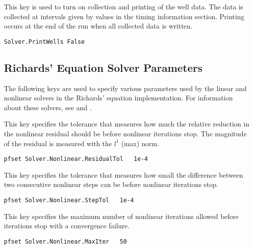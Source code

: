 {
This key is used to turn on collection and printing of the
well data.  The data is collected at intervals given by values
in the timing information section.  Printing occurs at the
end of the run when all collected data is written. 
}
\begin{display}\begin{verbatim}
Solver.PrintWells False
\end{verbatim}\end{display}


\subsection{Richards' Equation Solver Parameters}
\label{RE Solver Parameters}

The following keys are used to specify various parameters used by the linear
and nonlinear solvers in the Richards' equation implementation.
For information about these solvers, see 
\cite{Woodward98} and \cite{Ashby-Falgout90}.

{This key specifies the tolerance that measures how much the relative 
reduction in the nonlinear residual should be before nonlinear 
iterations stop.  The magnitude of the residual is measured with 
the $l^1$ (max) norm.
}
\begin{display}\begin{verbatim}
pfset Solver.Nonlinear.ResidualTol   1e-4
\end{verbatim}\end{display}

{This key specifies the tolerance that measures how small the 
difference between two consecutive nonlinear steps can be before 
nonlinear iterations stop.
}
\begin{display}\begin{verbatim}
pfset Solver.Nonlinear.StepTol   1e-4
\end{verbatim}\end{display}

{This key specifies the maximum number of nonlinear iterations allowed before
iterations stop with a convergence failure.
}
\begin{display}\begin{verbatim}
pfset Solver.Nonlinear.MaxIter   50
\end{verbatim}\end{display}


